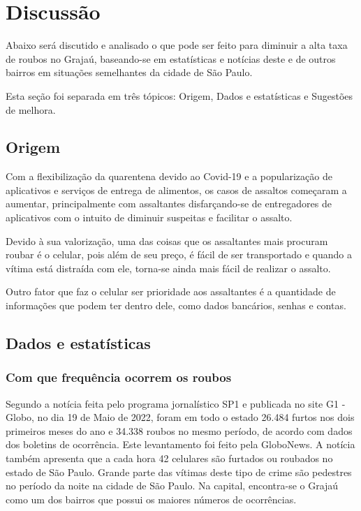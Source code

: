 \section{Discussão}

    Abaixo será discutido e analisado o que pode ser feito para diminuir a alta taxa de
    roubos no Grajaú, baseando-se em estatísticas e notícias deste e de outros bairros em 
    situações semelhantes da cidade de São Paulo.

    Esta seção foi separada em três tópicos: Origem, Dados e estatísticas e Sugestões de melhora.

    \subsection{Origem}

        Com a flexibilização da quarentena devido ao Covid-19 e a popularização de aplicativos
        e serviços de entrega de alimentos, os casos de assaltos começaram a aumentar,
        principalmente com assaltantes disfarçando-se de entregadores de aplicativos com o
        intuito de diminuir suspeitas e facilitar o assalto.
        
        Devido à sua valorização, uma das coisas que os assaltantes mais procuram roubar é o
        celular, pois além de seu preço, é fácil de ser transportado e quando a vítima está
        distraída com ele, torna-se ainda mais fácil de realizar o assalto.
        
        Outro fator que faz o celular ser prioridade aos assaltantes é a quantidade de informações
        que podem ter dentro dele, como dados bancários, senhas e contas.

    \subsection{Dados e estatísticas}

        \subsubsection{Com que frequência ocorrem os roubos}
        Segundo a notícia feita pelo programa jornalístico SP1 e publicada no site G1 - Globo,
        no dia 19 de Maio de 2022, foram em todo o estado 26.484 furtos nos dois primeiros 
        meses do ano e 34.338 roubos no mesmo período, de acordo com dados dos boletins de 
        ocorrência. Este levantamento foi feito pela GloboNews. A notícia também apresenta que
        a cada hora 42 celulares são furtados ou roubados no estado de São Paulo. Grande parte
        das vítimas deste tipo de crime são pedestres no período da noite na cidade de São Paulo.
        Na capital, encontra-se o Grajaú como um dos bairros que possui os maiores números de ocorrências.

